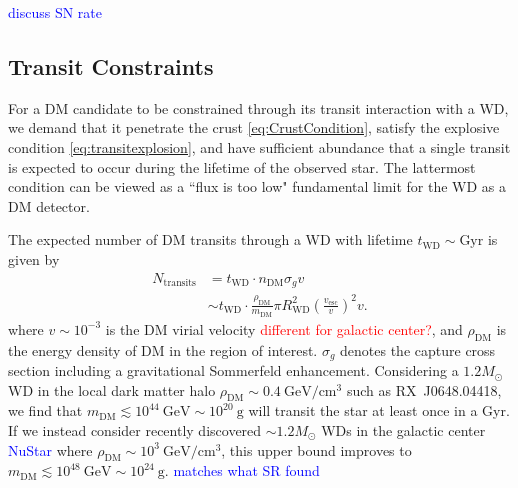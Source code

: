 \documentclass[twocolumn,showpacs,preprintnumbers,amsmath,amssymb,prd]{revtex4}
\newcommand{\GeV}{\text{GeV}}
\def\r{\right)}
\def\l{\left(}
\begin{document}
\textcolor{blue}{discuss SN rate}

\subsection{Transit Constraints}
\label{sec:TransitConstraints}

For a DM candidate to be constrained through its transit interaction with a WD, we demand that it penetrate the crust \eqref{eq:CrustCondition}, satisfy the explosive condition \eqref{eq:transitexplosion}, and have sufficient abundance that a single transit is expected to occur during the lifetime of the observed star. The lattermost condition can be viewed as a ``flux is too low" fundamental limit for the WD as a DM detector. 

The expected number of DM transits through a WD with lifetime $t_\text{WD} \sim \text{Gyr}$ is given by
\begin{align}
N_\text{transits}  &= t_\text{WD} \cdot n_\text{DM} \sigma_g v \nonumber\\
 &  \sim t_\text{WD} \cdot \frac{\rho_{\text{DM}}}{m_\text{DM}} \pi R_\text{WD}^2 \l\frac{v_\text{esc}}{v}\r^2 v. 
\label{eq:TransitFluxCondition}
\end{align}
where $v \sim 10^{-3}$ is the DM virial velocity \textcolor{red}{different for galactic center?}, and $\rho_{\text{DM}}$ is the energy density of DM in the region of interest. $\sigma_g$ denotes the capture cross section including a gravitational Sommerfeld enhancement. Considering a $1.2 M_{\odot}$ WD in the local dark matter halo $\rho_{\text{DM}} \sim 0.4~\text{GeV}/\text{cm}^3$ such as RX~J0648.04418, we find that $m_\text{DM} \lesssim 10^{44} ~\GeV \sim 10^{20} ~\text{g}$ will transit the star at least once in a Gyr. If we instead consider recently discovered $\sim 1.2 M_{\odot}$ WDs in the galactic center \textcolor{blue}{NuStar} where $\rho_{\text{DM}} \sim 10^3 ~\text{GeV}/\text{cm}^3$, this upper bound improves to $m_\text{DM} \lesssim 10^{48} ~\GeV \sim 10^{24} ~\text{g}$. \textcolor{blue}{matches what SR found}
\end{document}
